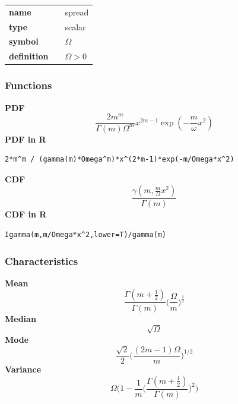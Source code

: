 \noindent\begin{tabular}{p{2cm}cl}
\textbf{name} & & spread \\
\textbf{type} & & scalar \\
\textbf{symbol} & & $\Omega$  \\
\textbf{definition} & & $ \Omega > 0$
\end{tabular}
\subsubsection*{Functions}

\smallskip \noindent \hspace{.2cm} \textbf{PDF} 
\begin{equation*}\frac{2m^m}{\Gamma(m)\Omega^m}x^{2m-1} \exp(-\frac{m}{\omega}x^2)\end{equation*}
\smallskip \noindent \hspace{.2cm} \textbf{PDF in R}  
\begin{verbatim}2*m^m / (gamma(m)*Omega^m)*x^(2*m-1)*exp(-m/Omega*x^2)\end{verbatim}
\smallskip \noindent \hspace{.2cm} \textbf{CDF} 
\begin{equation*}\frac{\gamma(m,\frac{m}{\Omega}x^2)}{\Gamma(m)}\end{equation*}
\smallskip \noindent \hspace{.2cm} \textbf{CDF in R} 
\begin{verbatim}Igamma(m,m/Omega*x^2,lower=T)/gamma(m)\end{verbatim}
\smallskip
\subsubsection*{Characteristics}
\smallskip \noindent \hspace{.2cm} \textbf{Mean} 
\begin{equation*}\frac{\Gamma(m+\frac{1}{2})}{\Gamma(m)} \Big(\frac{\Omega}{m}\Big)^{\frac12}\end{equation*}
\smallskip \noindent \hspace{.2cm} \textbf{Median} 
\begin{equation*}\sqrt{\Omega}\end{equation*}
\smallskip \noindent \hspace{.2cm} \textbf{Mode} 
\begin{equation*}\frac{\sqrt{2}}{2} \Big(\frac{(2m-1)\Omega}{m} \Big)^{1/2}\end{equation*}
\smallskip \noindent \hspace{.2cm} \textbf{Variance} 
\begin{equation*}\Omega \Big(1-\frac{1}{m}\Big(\frac{\Gamma(m+\frac{1}{2})}{\Gamma(m)}\Big)^2 \Big)\end{equation*}
\smallskip
